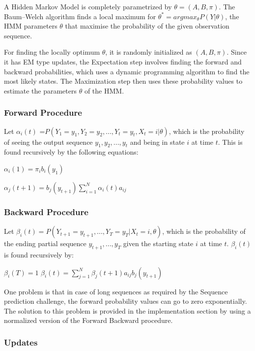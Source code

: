 \documentclass[letterpaper]{article}
\begin{document}
A Hidden Markov Model is completely parametrized by  $\theta = (A,B,\pi)$. The Baum–Welch algorithm finds a local maximum for $\theta^{*} = argmax_{\theta} P(Y|\theta)$, the HMM parameters $\theta$ that maximise the probability of the given observation sequence.
 
For finding the locally optimum $\theta$, it is randomly initialized as $(A, B, \pi)$. Since it has EM type updates, the Expectation step involves finding the forward and backward probabilities, which uses a dynamic programming algorithm to find the most likely states. The Maximization step then uses these probability values to estimate the parameters $\theta$ of the HMM.

\subsubsection{Forward Procedure}
Let $\alpha_{i}(t)$ =$P(Y_{1}=y_{1},Y_{2}=y_{2},...,Y_{t}=y_{t},X_{t}={i}|\theta)$, which is the probability of seeing the output sequence $y_{1},y_{2},...,y_{t}$ and being in state $i$ at time $t$. This is found recursively by the following equations:

\begin{center}
	$\alpha_{i}(1)=\pi_{i} b_{i}(y_{1})$
	
	$\alpha_{j}(t+1)=b_{j}(y_{t+1}) \sum_{i=1}^{N}\alpha_{i}(t) a_{ij}$
\end{center}

\subsubsection{Backward Procedure}

Let $\beta_{i}(t)=P(Y_{t+1}=y_{t+1},...,Y_{T}=y_{T}|X_{t}=i,\theta)$, which is the probability of the ending partial sequence $y_{t+1},...,y_{T}$ given the starting state $i$ at time $t$. $\beta_{i}(t)$ is found recursively by:
\begin{center}
	$\beta_{i}(T)=1$
	$\beta_{i}(t)=\sum_{j=1}^N \beta_{j}(t+1) a_{ij} b_{j}(y_{t+1})$
\end{center}
 
One problem is that in case of long sequences as required by the Sequence prediction challenge, the forward probability values can go to zero exponentially. The solution to this problem is provided in the implementation section by using a normalized version of the Forward Backward procedure.

\subsubsection{Updates}
\end{document}

